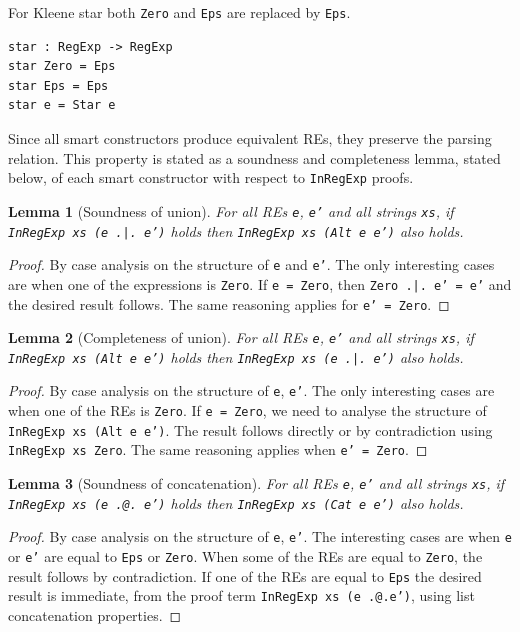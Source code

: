\documentclass{llncs}
\newcommand{\idris}[1]{\texttt{#1}}%
\newtheorem{Lemma}{Lemma}
\begin{document}
For Kleene star both \idris{Zero} and \idris{Eps} are replaced by \idris{Eps}.
\begin{verbatim}
star : RegExp -> RegExp
star Zero = Eps
star Eps = Eps
star e = Star e
\end{verbatim}
Since all smart constructors produce equivalent REs, they preserve the
parsing relation. This property is stated as a soundness and
completeness lemma, stated below, of each smart constructor with
respect to \idris{InRegExp} proofs.
\begin{Lemma}[Soundness of union]
For all REs \idris{e}, \idris{e'} and all strings \idris{xs}, if
\idris{InRegExp xs (e .|. e')} holds then \idris{InRegExp xs (Alt e
  e')} also holds.
\end{Lemma}
\begin{proof}
  By case analysis on the structure of \idris{e} and \idris{e'}. The
  only interesting cases are when one of the expressions is
  \idris{Zero}. If \idris{e = Zero}, then \idris{Zero .|. e' = e'} and
  the desired result follows. The same reasoning applies for \idris{e'
  = Zero}.
\end{proof}
\begin{Lemma}[Completeness of union]
For all REs \idris{e}, \idris{e'} and all strings \idris{xs}, if
\idris{InRegExp xs (Alt e e')} holds then \idris{InRegExp xs (e
  .|. e')} also holds.
\end{Lemma}
\begin{proof}
   By case analysis on the structure of \idris{e}, \idris{e'}. The
   only interesting cases are when one of the REs is \idris{Zero}.  If
   \idris{e = Zero}, we need to analyse the structure of
   \idris{InRegExp xs (Alt e e')}. The result follows directly or by
   contradiction using \idris{InRegExp xs Zero}. The same reasoning
   applies when \idris{e' = Zero}.
\end{proof}
\begin{Lemma}[Soundness of concatenation]
For all REs \idris{e}, \idris{e'} and all strings \idris{xs}, if
\idris{InRegExp xs (e .@. e')} holds then \idris{InRegExp xs (Cat e
  e')} also holds.
\end{Lemma}
\begin{proof}
  By case analysis on the structure of \idris{e}, \idris{e'}. The
  interesting cases are when \idris{e} or \idris{e'} are equal to
  \idris{Eps} or \idris{Zero}. When some of the REs are equal to
  \idris{Zero}, the result follows by contradiction. If one of the REs
  are equal to \idris{Eps} the desired result is immediate, from the
  proof term \idris{InRegExp xs (e .@.e')}, using list concatenation
  properties.
\end{proof}
\end{document}
